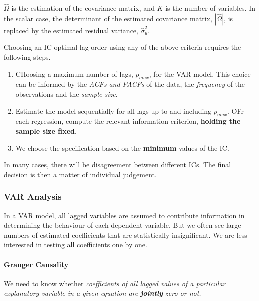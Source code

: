 \documentclass[11pt]{article}
\begin{document}
\begin{note}
    $\hat{\Omega}$ is the estimation of the covariance matrix, and $K$ is the number of variables. In the scalar case, the determinant of the estimated covariance matrix, $|\hat{\Omega}|$, is replaced by the estimated residual variance, $\hat{\sigma}_u^2$.
\end{note}

\begin{procedure}
    Choosing an IC optimal lag order using any of the above criteria requires the following steps.
    \begin{enumerate}
        \item CHoosing a maximum number of lags, $p_{max}$, for the VAR model. This choice can be informed by the \textit{ACFs and PACFs} of the data, the \textit{frequency} of the observations and the \textit{sample size}.
        \item Estimate the model sequentially for all lags up to and including $p_{max}$. OFr each regression, compute the relevant information criterion, \textbf{holding the sample size fixed}.
        \item We choose the specification based on the \textbf{minimum} values of the IC. 
    \end{enumerate}
    \begin{note}
        In many cases, there will be disagreement between different ICs. The final decision is then a matter of individual judgement.
    \end{note}
\end{procedure}

\subsubsection{VAR Analysis}

In a VAR model, all lagged variables are assumed to contribute information in determining the behaviour of each dependent variable. But we often see large numbers of estimated coefficients that are statistically insignificant. We are less interested in testing all coefficients one by one.


\paragraph{Granger Causality} \mbox{}

We need to know whether \textit{coefficients of all lagged values of a particular explanatory variable in a given equation are \textbf{jointly} zero or not.}
\end{document}
